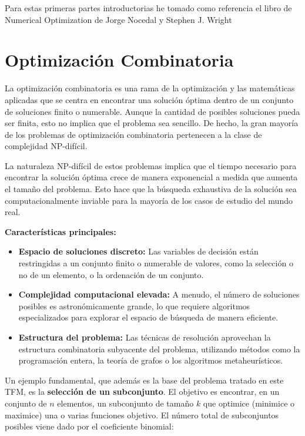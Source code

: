 \documentclass[12pt,a4paper]{book}
\begin{document}
Para estas primeras partes introductorias he tomado como referencia el libro \cite{Numerical_optimization_nocedal_wright} de Numerical Optimization de Jorge Nocedal y Stephen J. Wright

\section{Optimización Combinatoria}
La optimización combinatoria es una rama de la optimización y las matemáticas aplicadas que se centra en encontrar una solución óptima dentro de un conjunto de soluciones finito o numerable. Aunque la cantidad de posibles soluciones pueda ser finita, esto no implica que el problema sea sencillo. De hecho, la gran mayoría de los problemas de optimización combinatoria pertenecen a la clase de complejidad NP-difícil.

La naturaleza NP-difícil de estos problemas implica que el tiempo necesario para encontrar la solución óptima crece de manera exponencial a medida que aumenta el tamaño del problema. Esto hace que la búsqueda exhaustiva de la solución sea computacionalmente inviable para la mayoría de los casos de estudio del mundo real.

\textbf{Características principales:}
\begin{itemize}
    \item \textbf{Espacio de soluciones discreto:} Las variables de decisión están restringidas a un conjunto finito o numerable de valores, como la selección o no de un elemento, o la ordenación de un conjunto.
    \item \textbf{Complejidad computacional elevada:} A menudo, el número de soluciones posibles es astronómicamente grande, lo que requiere algoritmos especializados para explorar el espacio de búsqueda de manera eficiente.
    \item \textbf{Estructura del problema:} Las técnicas de resolución aprovechan la estructura combinatoria subyacente del problema, utilizando métodos como la programación entera, la teoría de grafos o los algoritmos metaheurísticos.
\end{itemize}

Un ejemplo fundamental, que además es la base del problema tratado en este TFM, es la \textbf{selección de un subconjunto}. El objetivo es encontrar, en un conjunto de $n$ elementos, un subconjunto de tamaño $k$ que optimice (minimice o maximice) una o varias funciones objetivo. El número total de subconjuntos posibles viene dado por el coeficiente binomial:
\end{document}
